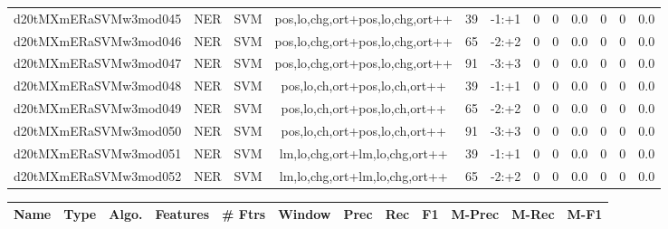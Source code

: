 \documentclass[a4paper]{article}
\begin{document}
\begin{landscape}
\begin{center}
\begin{tabular}{ |c|c|c|c|c|c|c|c|c|c|c|c|}
 
 	
 	\small{ d20tMXmERaSVMw3mod045 } & \small{ NER} & \small{  SVM }  & pos,lo,chg,ort+pos,lo,chg,ort++  &  39 &  \small{  -1:+1 }  &  0 & 0 & 0.0  &  0 & 0 & 0.0 \\
 	

 
 	
 	\small{ d20tMXmERaSVMw3mod046 } & \small{ NER} & \small{  SVM }  & pos,lo,chg,ort+pos,lo,chg,ort++  &  65 &  \small{  -2:+2 }  &  0 & 0 & 0.0  &  0 & 0 & 0.0 \\
 	

 
 	
 	\small{ d20tMXmERaSVMw3mod047 } & \small{ NER} & \small{  SVM }  & pos,lo,chg,ort+pos,lo,chg,ort++  &  91 &  \small{  -3:+3 }  &  0 & 0 & 0.0  &  0 & 0 & 0.0 \\
 	

 
 	
 	\small{ d20tMXmERaSVMw3mod048 } & \small{ NER} & \small{  SVM }  & pos,lo,ch,ort+pos,lo,ch,ort++  &  39 &  \small{  -1:+1 }  &  0 & 0 & 0.0  &  0 & 0 & 0.0 \\
 	

 
 	
 	\small{ d20tMXmERaSVMw3mod049 } & \small{ NER} & \small{  SVM }  & pos,lo,ch,ort+pos,lo,ch,ort++  &  65 &  \small{  -2:+2 }  &  0 & 0 & 0.0  &  0 & 0 & 0.0 \\
 	

 
 	
 	\small{ d20tMXmERaSVMw3mod050 } & \small{ NER} & \small{  SVM }  & pos,lo,ch,ort+pos,lo,ch,ort++  &  91 &  \small{  -3:+3 }  &  0 & 0 & 0.0  &  0 & 0 & 0.0 \\
 	

 
 	
 	\small{ d20tMXmERaSVMw3mod051 } & \small{ NER} & \small{  SVM }  & lm,lo,chg,ort+lm,lo,chg,ort++  &  39 &  \small{  -1:+1 }  &  0 & 0 & 0.0  &  0 & 0 & 0.0 \\
 	

 
 	
 	\small{ d20tMXmERaSVMw3mod052 } & \small{ NER} & \small{  SVM }  & lm,lo,chg,ort+lm,lo,chg,ort++  &  65 &  \small{  -2:+2 }  &  0 & 0 & 0.0  &  0 & 0 & 0.0 \\
 	
 \hline
\end{tabular}
\end{center}




\begin{center}
\begin{tabular}{ |c|c|c|c|c|c|c|c|c|c|c|c|} 
 \hline
 	Name & Type & Algo. & Features & \# Ftrs & Window & Prec & Rec & F1 & M-Prec & M-Rec & M-F1\\
 \hline


\end{tabular}
\end{center}
\end{landscape}
\end{document}
